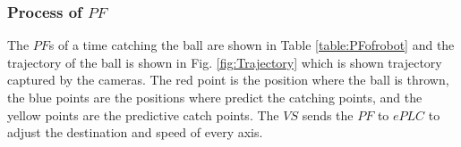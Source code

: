 \documentclass[journal,UTF8]{IEEEtran}
\begin{document}
%
%
\subsubsection{Process of $PF$}
The $PF$s of a time catching the ball are shown in Table \ref{table:PFofrobot} and the trajectory of the ball is shown in Fig. \ref{fig:Trajectory} which is shown trajectory captured by the cameras. The red point is the position where the ball is thrown, the blue points are the positions where predict the catching points, and the yellow points are the predictive catch points. The $VS$ sends the $PF$ to $ePLC$ to adjust the destination and speed of every axis.
\end{document}
